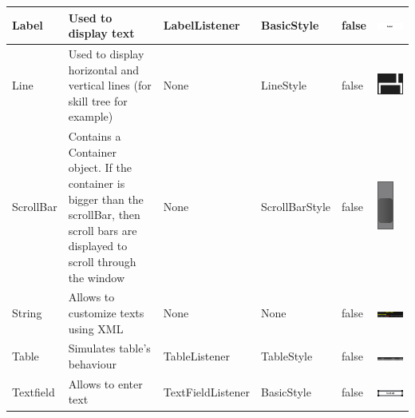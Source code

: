 \documentclass{scrreprt}
\begin{document}
\begin{center}
\begin{tabular}{|p{2.2cm}|p{4cm}|p{3.5cm}|p{2cm}|p{1.5cm}|p{4cm}|}
\hline
Label & Used to display text & LabelListener & BasicStyle & false & \includegraphics[scale=0.6]{label.png} \\
\hline
Line & Used to display horizontal and vertical lines (for skill tree for example) & None & LineStyle & false & \includegraphics[scale=0.5]{Line.png} \\
\hline
ScrollBar & Contains a Container object. If the container is bigger than the scrollBar, then scroll bars are displayed to scroll through the window & None & ScrollBarStyle & false & \includegraphics[scale=0.8, angle=90]{ScrollBar.png} \\
\hline
String & Allows to customize texts using XML & None & None & false & \includegraphics[scale=0.3]{string.png} \\
\hline
Table & Simulates table's behaviour & TableListener & TableStyle & false & \includegraphics[scale=0.2]{Table.png} \\
\hline
Textfield & Allows to enter text & TextFieldListener & BasicStyle & false & \includegraphics[scale=0.5]{textfield.png} \\
\hline
\end{tabular}
\end{center}
\end{document}
